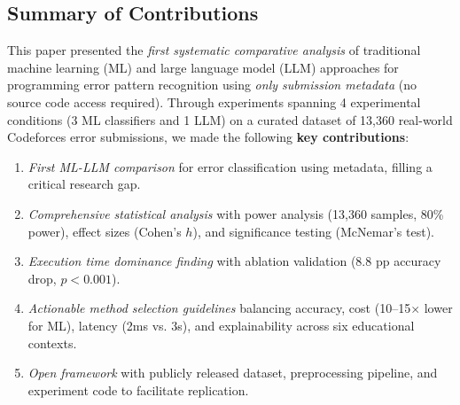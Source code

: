 \documentclass[10pt,letterpaper]{article}
\begin{document}
\subsection*{Summary of Contributions}
This paper presented the \textit{first systematic comparative analysis} of traditional machine learning (ML) and large language model (LLM) approaches for programming error pattern recognition using \textit{only submission metadata} (no source code access required). Through experiments spanning 4 experimental conditions (3 ML classifiers and 1 LLM) on a curated dataset of 13,360 real-world Codeforces error submissions, we made the following \textbf{key contributions}:
{\renewcommand{\labelenumi}{(\arabic{enumi})}
\begin{enumerate}
\item \textit{First ML-LLM comparison} for error classification using metadata, filling a critical research gap.
\item \textit{Comprehensive statistical analysis} with power analysis (13,360 samples, 80\% power), effect sizes (Cohen's $h$), and significance testing (McNemar's test).
\item \textit{Execution time dominance finding} with ablation validation (8.8 pp accuracy drop, $p < 0.001$).
\item \textit{Actionable method selection guidelines} balancing accuracy, cost (10--15$\times$ lower for ML), latency (2ms vs. 3s), and explainability across six educational contexts.
\item \textit{Open framework} with publicly released dataset, preprocessing pipeline, and experiment code to facilitate replication.
\end{enumerate}}
\end{document}
